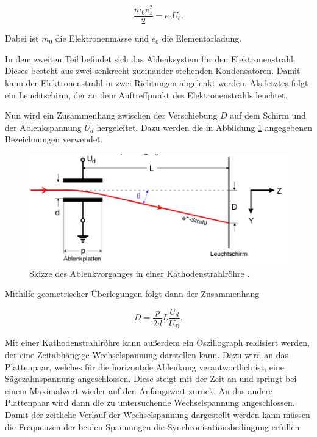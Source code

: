 \begin{equation*}
  \frac{m_0 v_z^2}{2} = e_0 U_b.
\end{equation*}

Dabei ist $m_0$ die Elektronenmasse und $e_0$ die Elementarladung.

In dem zweiten Teil befindet sich das Ablenksystem für den Elektronenstrahl. Dieses
besteht aus zwei senkrecht zueinander stehenden Kondensatoren. Damit kann der Elektronenstrahl
in zwei Richtungen abgelenkt werden.
Als letztes folgt ein Leuchtschirm, der an dem Auftreffpunkt des Elektronenstrahls
leuchtet.

Nun wird ein Zusammenhang zwischen der Verschiebung $D$ auf dem Schirm und der
Ablenkspannung $U_d$ hergeleitet. Dazu werden die in Abbildung \ref{abb:2} angegebenen
Bezeichnungen verwendet.

\begin{figure}[H]
  \centering
  \includegraphics[width=\textwidth]{content/Ablenkung.png}
  \caption{Skizze des Ablenkvorganges in einer Kathodenstrahlröhre \cite{1}.}
  \label{abb:2}
\end{figure}

Mithilfe geometrischer Überlegungen folgt dann der Zusammenhang

\begin{equation}
  D = \frac{p}{2d} L \frac{U_d}{U_B}.
  \label{eq:1}
\end{equation}

Mit einer Kathodenstrahlröhre kann außerdem ein Oszillograph realisiert werden,
der eine Zeitabhängige Wechselspannung darstellen kann. Dazu wird an das Plattenpaar,
welches für die horizontale Ablenkung verantwortlich ist, eine Sägezahnspannung angeschlossen.
Diese steigt mit der Zeit an und springt bei einem Maximalwert wieder auf den Anfangswert
zurück. An das andere Plattenpaar wird dann die zu untersuchende Wechselspannung angeschlossen.
Damit der zeitliche Verlauf der Wechselspannung dargestellt werden kann müssen die
Frequenzen der beiden Spannungen die Synchronisationsbedingung erfüllen:

